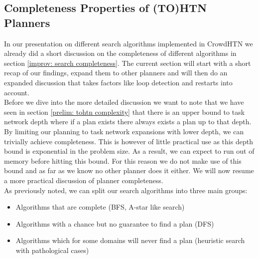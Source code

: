 \subsection{Completeness Properties of (TO)HTN Planners}
In our presentation on different search algorithms implemented in CrowdHTN we already did a short discussion on the completeness of different algorithms in section \ref{improv: search completeness}. The current section will start with a short recap of our findings, expand them to other planners and will then do an expanded discussion that takes factors like loop detection and restarts into account. \\
Before we dive into the more detailed discussion we want to note that we have seen in section \ref{prelim: tohtn complexity} that there is an upper bound to task network depth where if a plan exists there always exists a plan up to that depth. By limiting our planning to task network expansions with lower depth, we can trivially achieve completeness. This is however of little practical use as this depth bound is exponential in the problem size. As a result, we can expect to run out of memory before hitting this bound. For this reason we do not make use of this bound and as far as we know no other planner does it either. We will now resume a more practical discussion of planner completeness.\\ 
As previously noted, we can split our search algorithms into three main groups:
\begin{itemize}
	\item Algorithms that are complete (BFS, A-star like search)
	\item Algorithms with a chance but no guarantee to find a plan (DFS)
	\item Algorithms which for some domains will never find a plan (heuristic search with pathological cases)
\end{itemize}
